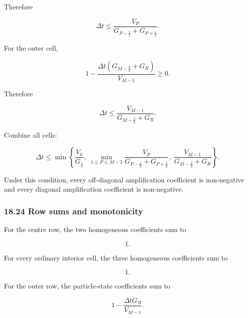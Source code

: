 \documentclass[11pt,a4paper]{article}
\begin{document}
Therefore

\begin{equation}
\boxed{
\Delta t
\le
\frac{
V_P
}{
G_{P-\frac12}+G_{P+\frac12}
}.
}
\tag{TRISO-FV-297}
\label{eq:triso-fv-297}
\end{equation}

For the outer cell,

\begin{equation}
1-
\frac{
\Delta t
\left(
G_{M-\frac32}+G_R
\right)
}{
V_{M-1}
}
\ge0.
\tag{TRISO-FV-298}
\label{eq:triso-fv-298}
\end{equation}

Therefore

\begin{equation}
\boxed{
\Delta t
\le
\frac{
V_{M-1}
}{
G_{M-\frac32}+G_R
}.
}
\tag{TRISO-FV-299}
\label{eq:triso-fv-299}
\end{equation}

Combine all cells:

\begin{equation}
\boxed{
\Delta t
\le
\min
\left\{
\frac{V_0}{G_{\frac12}},
\;
\min_{1\le P\le M-2}
\frac{
V_P
}{
G_{P-\frac12}+G_{P+\frac12}
},
\;
\frac{
V_{M-1}
}{
G_{M-\frac32}+G_R
}
\right\}.
}
\tag{TRISO-FV-300}
\label{eq:triso-fv-300}
\end{equation}

Under this condition, every off-diagonal amplification coefficient is non-negative and every diagonal amplification coefficient is non-negative.

\subsubsection*{18.24 Row sums and monotonicity}

For the centre row, the two homogeneous coefficients sum to

\begin{equation}
1.
\tag{TRISO-FV-301}
\label{eq:triso-fv-301}
\end{equation}

For every ordinary interior cell, the three homogeneous coefficients sum to

\begin{equation}
1.
\tag{TRISO-FV-302}
\label{eq:triso-fv-302}
\end{equation}

For the outer row, the particle-state coefficients sum to

\begin{equation}
1-
\frac{\Delta tG_R}{V_{M-1}}.
\tag{TRISO-FV-303}
\label{eq:triso-fv-303}
\end{equation}
\end{document}
